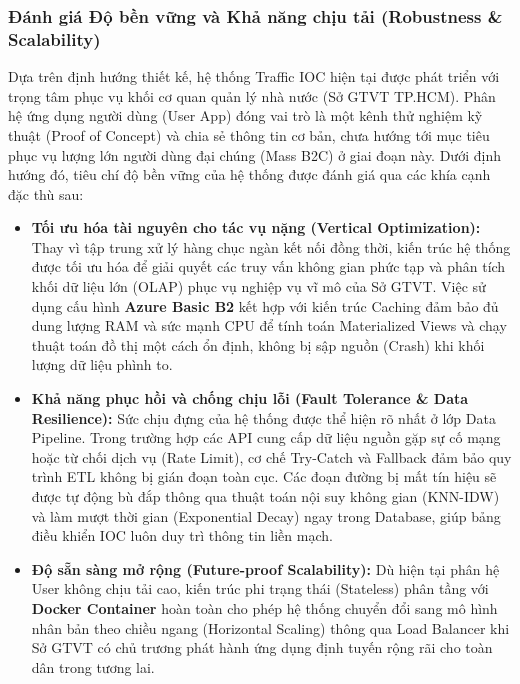 \subsubsection{Đánh giá Độ bền vững và Khả năng chịu tải (Robustness \& Scalability)}

Dựa trên định hướng thiết kế, hệ thống Traffic IOC hiện tại được phát triển với trọng tâm phục vụ khối cơ quan quản lý nhà nước (Sở GTVT TP.HCM). Phân hệ ứng dụng người dùng (User App) đóng vai trò là một kênh thử nghiệm kỹ thuật (Proof of Concept) và chia sẻ thông tin cơ bản, chưa hướng tới mục tiêu phục vụ lượng lớn người dùng đại chúng (Mass B2C) ở giai đoạn này. Dưới định hướng đó, tiêu chí độ bền vững của hệ thống được đánh giá qua các khía cạnh đặc thù sau:

\begin{itemize}
    \item \textbf{Tối ưu hóa tài nguyên cho tác vụ nặng (Vertical Optimization):} Thay vì tập trung xử lý hàng chục ngàn kết nối đồng thời, kiến trúc hệ thống được tối ưu hóa để giải quyết các truy vấn không gian phức tạp và phân tích khối dữ liệu lớn (OLAP) phục vụ nghiệp vụ vĩ mô của Sở GTVT. Việc sử dụng cấu hình \textbf{Azure Basic B2} kết hợp với kiến trúc Caching đảm bảo đủ dung lượng RAM và sức mạnh CPU để tính toán Materialized Views và chạy thuật toán đồ thị một cách ổn định, không bị sập nguồn (Crash) khi khối lượng dữ liệu phình to.
    
    \item \textbf{Khả năng phục hồi và chống chịu lỗi (Fault Tolerance \& Data Resilience):} Sức chịu đựng của hệ thống được thể hiện rõ nhất ở lớp Data Pipeline. Trong trường hợp các API cung cấp dữ liệu nguồn gặp sự cố mạng hoặc từ chối dịch vụ (Rate Limit), cơ chế Try-Catch và Fallback đảm bảo quy trình ETL không bị gián đoạn toàn cục. Các đoạn đường bị mất tín hiệu sẽ được tự động bù đắp thông qua thuật toán nội suy không gian (KNN-IDW) và làm mượt thời gian (Exponential Decay) ngay trong Database, giúp bảng điều khiển IOC luôn duy trì thông tin liền mạch.
    
    \item \textbf{Độ sẵn sàng mở rộng (Future-proof Scalability):} Dù hiện tại phân hệ User không chịu tải cao, kiến trúc phi trạng thái (Stateless) phân tầng với \textbf{Docker Container} hoàn toàn cho phép hệ thống chuyển đổi sang mô hình nhân bản theo chiều ngang (Horizontal Scaling) thông qua Load Balancer khi Sở GTVT có chủ trương phát hành ứng dụng định tuyến rộng rãi cho toàn dân trong tương lai.
\end{itemize}

